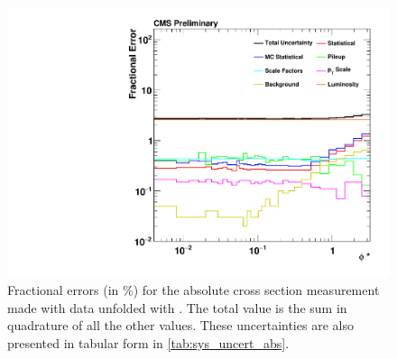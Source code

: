 \begin{figure}[!p]
    \centering
    \includegraphics[width=\textwidth]{figures/data_uncertainty_absolute.pdf}
    \caption[
        Fractional errors (in \%) for the absolute cross section measurement
        made with data unfolded with \MADGRAPH.
    ]{
        Fractional errors (in \%) for the absolute cross section measurement
        made with data unfolded with \MADGRAPH. The total value is the sum in
        quadrature of all the other values. These uncertainties are also
        presented in tabular form in \cref{tab:sys_uncert_abs}.
    }
    \label{fig:sys_uncert_abs}
\end{figure}
